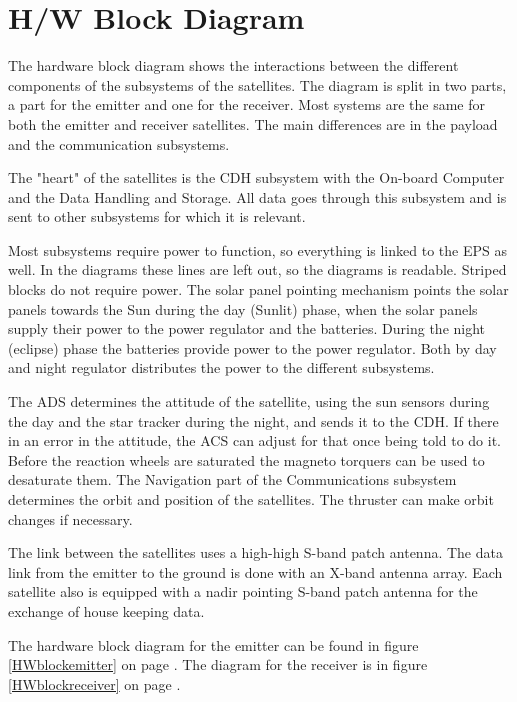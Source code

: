 \section{H/W Block Diagram}
The hardware block diagram shows the interactions between the different components of the subsystems of the satellites. The diagram is split in two parts, a part for the emitter and one for the receiver. Most systems are the same for both the emitter and receiver satellites. The main differences are in the payload and the communication subsystems.

The "heart" of the satellites is the \ac{CDH} subsystem with the On-board Computer and the Data Handling and Storage. All data goes through this subsystem and is sent to other subsystems for which it is relevant. 

Most subsystems require power to function, so everything is linked to the \ac{EPS} as well. In the diagrams these lines are left out, so the diagrams is readable. Striped blocks do not require power. The solar panel pointing mechanism points the solar panels towards the Sun during the day (Sunlit) phase, when the solar panels supply their power to the power regulator and the batteries. During the night (eclipse) phase the batteries provide power to the power regulator. Both by day and night regulator distributes the power to the different subsystems.

The \ac{ADS} determines the attitude of the satellite, using the sun sensors during the day and the star tracker during the night, and sends it to the \ac{CDH}. If there in an error in the attitude, the \ac{ACS} can adjust for that once being told to do it. Before the reaction wheels are saturated the magneto torquers can be used to desaturate them. The Navigation part of the Communications subsystem determines the orbit and position of the satellites. The thruster can make orbit changes if necessary.

The link between the satellites uses a high-high S-band patch antenna. The data link from the emitter to the ground is done with an X-band antenna array. Each satellite also is equipped with a nadir pointing S-band patch antenna for the exchange of house keeping data.

The hardware block diagram for the emitter can be found in figure \ref{HWblockemitter} on page \pageref{HWblockemitter}. The diagram for the receiver is in figure \ref{HWblockreceiver} on page \pageref{HWblockreceiver}.

